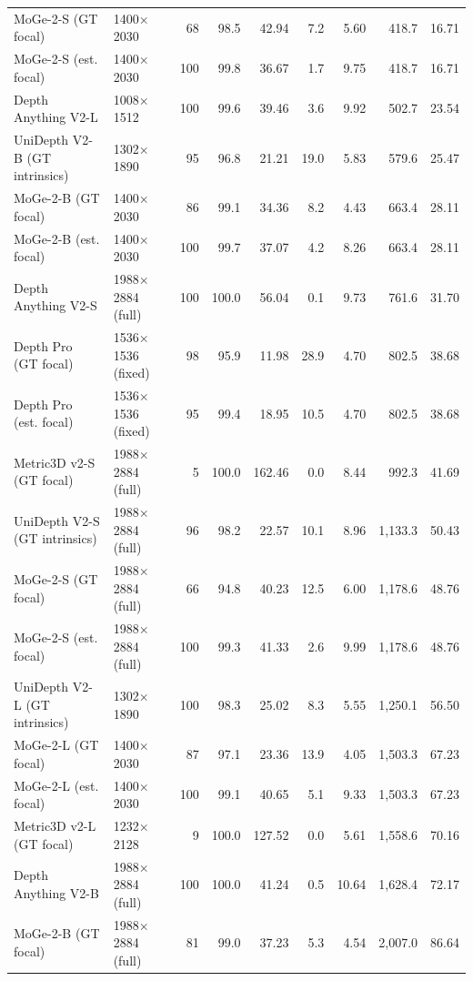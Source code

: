 \begin{tabular}{llrrrrrrr}
MoGe-2-S (GT focal) & 1400$\times$2030 & 68 & 98.5 & 42.94 & 7.2 & 5.60 & 418.7 & 16.71 \\
MoGe-2-S (est. focal) & 1400$\times$2030 & 100 & 99.8 & 36.67 & 1.7 & 9.75 & 418.7 & 16.71 \\
Depth Anything V2-L & 1008$\times$1512 & 100 & 99.6 & 39.46 & 3.6 & 9.92 & 502.7 & 23.54 \\
UniDepth V2-B (GT intrinsics) & 1302$\times$1890 & 95 & 96.8 & 21.21 & 19.0 & 5.83 & 579.6 & 25.47 \\
MoGe-2-B (GT focal) & 1400$\times$2030 & 86 & 99.1 & 34.36 & 8.2 & 4.43 & 663.4 & 28.11 \\
MoGe-2-B (est. focal) & 1400$\times$2030 & 100 & 99.7 & 37.07 & 4.2 & 8.26 & 663.4 & 28.11 \\
Depth Anything V2-S & 1988$\times$2884 (full) & 100 & 100.0 & 56.04 & 0.1 & 9.73 & 761.6 & 31.70 \\
Depth Pro (GT focal) & 1536$\times$1536 (fixed) & 98 & 95.9 & 11.98 & 28.9 & 4.70 & 802.5 & 38.68 \\
Depth Pro (est. focal) & 1536$\times$1536 (fixed) & 95 & 99.4 & 18.95 & 10.5 & 4.70 & 802.5 & 38.68 \\
Metric3D v2-S (GT focal) & 1988$\times$2884 (full) & 5 & 100.0 & 162.46 & 0.0 & 8.44 & 992.3 & 41.69 \\
UniDepth V2-S (GT intrinsics) & 1988$\times$2884 (full) & 96 & 98.2 & 22.57 & 10.1 & 8.96 & 1,133.3 & 50.43 \\
MoGe-2-S (GT focal) & 1988$\times$2884 (full) & 66 & 94.8 & 40.23 & 12.5 & 6.00 & 1,178.6 & 48.76 \\
MoGe-2-S (est. focal) & 1988$\times$2884 (full) & 100 & 99.3 & 41.33 & 2.6 & 9.99 & 1,178.6 & 48.76 \\
UniDepth V2-L (GT intrinsics) & 1302$\times$1890 & 100 & 98.3 & 25.02 & 8.3 & 5.55 & 1,250.1 & 56.50 \\
MoGe-2-L (GT focal) & 1400$\times$2030 & 87 & 97.1 & 23.36 & 13.9 & 4.05 & 1,503.3 & 67.23 \\
MoGe-2-L (est. focal) & 1400$\times$2030 & 100 & 99.1 & 40.65 & 5.1 & 9.33 & 1,503.3 & 67.23 \\
Metric3D v2-L (GT focal) & 1232$\times$2128 & 9 & 100.0 & 127.52 & 0.0 & 5.61 & 1,558.6 & 70.16 \\
Depth Anything V2-B & 1988$\times$2884 (full) & 100 & 100.0 & 41.24 & 0.5 & 10.64 & 1,628.4 & 72.17 \\
MoGe-2-B (GT focal) & 1988$\times$2884 (full) & 81 & 99.0 & 37.23 & 5.3 & 4.54 & 2,007.0 & 86.64 \\

\end{tabular}
